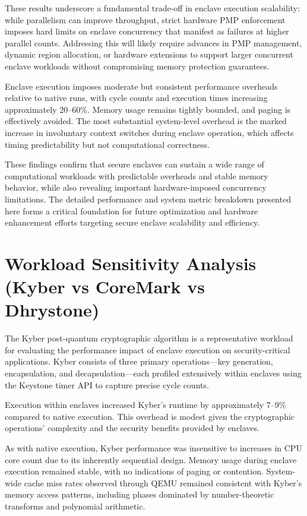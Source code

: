 These results underscore a fundamental trade-off in enclave execution scalability: while parallelism can improve throughput, strict hardware PMP enforcement imposes hard limits on enclave concurrency that manifest as failures at higher parallel counts. Addressing this will likely require advances in PMP management, dynamic region allocation, or hardware extensions to support larger concurrent enclave workloads without compromising memory protection guarantees.

Enclave execution imposes moderate but consistent performance overheads relative to native runs, with cycle counts and execution times increasing approximately 20--60\%. Memory usage remains tightly bounded, and paging is effectively avoided. The most substantial system-level overhead is the marked increase in involuntary context switches during enclave operation, which affects timing predictability but not computational correctness.

These findings confirm that secure enclaves can sustain a wide range of computational workloads with predictable overheads and stable memory behavior, while also revealing important hardware-imposed concurrency limitations. The detailed performance and system metric breakdown presented here forms a critical foundation for future optimization and hardware enhancement efforts targeting secure enclave scalability and efficiency.

\section{Workload Sensitivity Analysis (Kyber vs CoreMark vs Dhrystone)}

The Kyber post-quantum cryptographic algorithm is a representative workload for evaluating the performance impact of enclave execution on security-critical applications. Kyber consists of three primary operations—key generation, encapsulation, and decapsulation—each profiled extensively within enclaves using the Keystone timer API to capture precise cycle counts.

Execution within enclaves increased Kyber’s runtime by approximately 7–9\% compared to native execution. This overhead is modest given the cryptographic operations’ complexity and the security benefits provided by enclaves.

As with native execution, Kyber performance was insensitive to increases in CPU core count due to its inherently sequential design. Memory usage during enclave execution remained stable, with no indications of paging or contention. System-wide cache miss rates observed through QEMU remained consistent with Kyber’s memory access patterns, including phases dominated by number-theoretic transforms and polynomial arithmetic.

